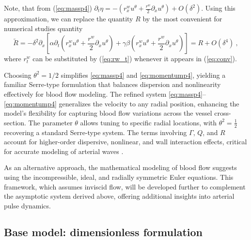 \documentclass[alpha-refs, 12pt]{wiley-article}
\begin{document}
Note, that from (\ref{eq:massp4}) $\partial_t\eta=-\left(r_x^w u^\theta+\frac{r^w}{2}\partial_xu^\theta\right)+O(\delta^2)$. Using this approximation, we can replace the quantity $R$ by the most convenient for numerical studies quantity
\begin{equation}\label{eq:conv} 
\tilde{R}=-\delta^2 \partial_x\left[ \alpha \partial_t\left(r_x^w u^\theta+\frac{r^w}{2}\partial_xu^\theta\right)+\gamma \beta \left(r_x^w u^\theta+\frac{r^w}{2}\partial_xu^\theta\right)\right]=R+O(\delta^4)\ ,
\end{equation}
where $r_t^w$ can be substituted by (\ref{eq:rw_t}) whenever it appears in (\ref{eq:conv}).


Choosing $\theta^2 = {1}/{2}$ simplifies \eqref{eq:massp4} and \eqref{eq:momentump4}, yielding a familiar Serre-type formulation that balances dispersion and nonlinearity effectively for blood flow modeling. The refined system \eqref{eq:massp4}--\eqref{eq:momentump4} generalizes the velocity to any radial position, enhancing the model's flexibility for capturing blood flow variations across the vessel cross-section. The parameter $\theta$ allows tuning to specific radial locations, with $\theta^2 = \frac{1}{2}$ recovering a standard Serre-type system. The terms involving $\Gamma$, $Q$, and $R$ account for higher-order dispersive, nonlinear, and wall interaction effects, critical for accurate modeling of arterial waves \citep{Mitsotakis2019}.

As an alternative approach, the mathematical modeling of blood flow suggests using the incompressible, ideal, and radially symmetric Euler equations. This framework, which assumes inviscid flow, will be developed further to complement the asymptotic system derived above, offering additional insights into arterial pulse dynamics.

\subsection{Base model: dimensionless formulation}
\end{document}
